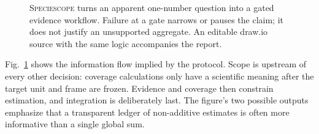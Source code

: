 \documentclass[conference]{IEEEtran}
\newcommand{\specscope}{\textsc{Speciescope}}
\begin{document}
\begin{figure}[t]
\centering
{}
\caption{\specscope{} turns an apparent one-number question into a gated evidence workflow. Failure at a gate narrows or pauses the claim; it does not justify an unsupported aggregate. An editable draw.io source with the same logic accompanies the report.}
\label{fig:workflow}
\end{figure}

Fig.~\ref{fig:workflow} shows the information flow implied by the protocol. Scope is upstream of every other decision: coverage calculations only have a scientific meaning after the target unit and frame are frozen. Evidence and coverage then constrain estimation, and integration is deliberately last. The figure's two possible outputs emphasize that a transparent ledger of non-additive estimates is often more informative than a single global sum.
\end{document}
